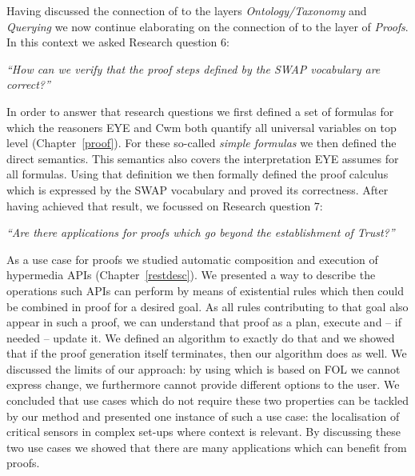 Having discussed the connection of \nthreelogic to the layers \emph{Ontology/Taxonomy} and \emph{Querying} we now continue elaborating on the connection
of \nthree to the layer of \emph{Proofs}. In this context we asked Research question 6:

\emph{``How can we verify that the proof steps defined by the SWAP vocabulary are correct?''}

In order to answer that research questions we first defined a set of formulas for which the reasoners EYE and Cwm both quantify all universal variables on top level (Chapter~\ref{proof}).
For these so-called \emph{simple formulas} we then defined the direct semantics. This semantics also covers the interpretation EYE assumes for all formulas.
Using that definition we then formally defined the proof calculus which is expressed by the SWAP vocabulary and proved its correctness.
After having achieved that result, we focussed on Research question 7:



\textit{ 
``Are there applications for \nthree proofs which go beyond the establishment of \emph{Trust}?''
}

As a use case for \nthree proofs we studied automatic composition and execution of hypermedia APIs (Chapter~\ref{restdesc}). We presented a way 
to describe the operations such APIs can perform by means of existential rules which then could be combined in proof for a desired goal. 
As all rules contributing to that goal also appear in such a proof, we can understand that proof as a plan, execute and -- if needed -- update it.
We defined an algorithm to exactly do that and we showed that if the proof generation itself terminates, then our algorithm does as well.
We discussed the limits of our approach: by using \nthree which is based on FOL we cannot express change, we furthermore cannot provide different options to the user.
We concluded that use cases which do not require these two properties can be tackled by our method and presented one instance of such a use case: the localisation of critical 
sensors in complex set-ups where context is relevant. By discussing these two use cases we showed that there are many applications which can benefit from \nthree proofs.

